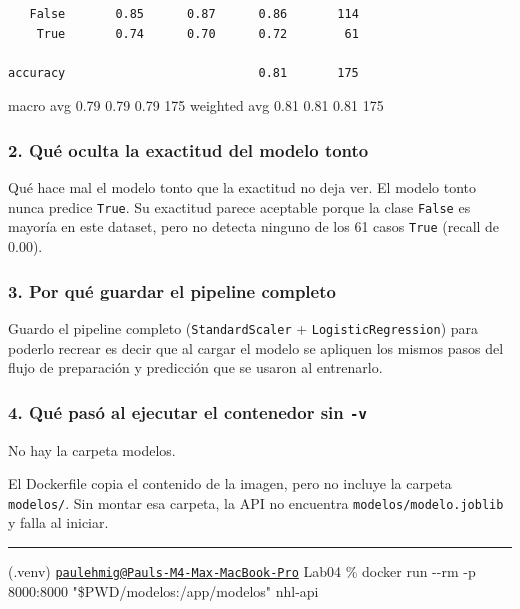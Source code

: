 \documentclass[
]{article}
\begin{document}
\begin{verbatim}
   False       0.85      0.87      0.86       114
    True       0.74      0.70      0.72        61

accuracy                           0.81       175
\end{verbatim}

macro avg 0.79 0.79 0.79 175 weighted avg 0.81 0.81 0.81 175

\subsubsection{2. Qué oculta la exactitud del modelo
tonto}\label{2-quuxe9-oculta-la-exactitud-del-modelo-tonto}

Qué hace mal el modelo tonto que la exactitud no deja ver. El modelo
tonto nunca predice \texttt{True}. Su exactitud parece aceptable porque
la clase \texttt{False} es mayoría en este dataset, pero no detecta
ninguno de los 61 casos \texttt{True} (recall de 0.00).

\subsubsection{3. Por qué guardar el pipeline
completo}\label{3-por-quuxe9-guardar-el-pipeline-completo}

Guardo el pipeline completo (\texttt{StandardScaler} +
\texttt{LogisticRegression}) para poderlo recrear es decir que al cargar
el modelo se apliquen los mismos pasos del flujo de preparación y
predicción que se usaron al entrenarlo.

\subsubsection{\texorpdfstring{4. Qué pasó al ejecutar el contenedor sin
\texttt{-v}}{4. Qué pasó al ejecutar el contenedor sin -v}}\label{4-quuxe9-pasuxf3-al-ejecutar-el-contenedor-sin--v}

No hay la carpeta modelos.

El Dockerfile copia el contenido de la imagen, pero no incluye la
carpeta \texttt{modelos/}. Sin montar esa carpeta, la API no encuentra
\texttt{modelos/modelo.joblib} y falla al iniciar.

\begin{center}\rule{0.5\linewidth}{0.5pt}\end{center}

(.venv)
\href{mailto:paulehmig@Pauls-M4-Max-MacBook-Pro}{\nolinkurl{paulehmig@Pauls-M4-Max-MacBook-Pro}}
Lab04 \% docker run -\/-rm -p 8000:8000 "\$PWD/modelos:/app/modelos"
nhl-api
\end{document}
